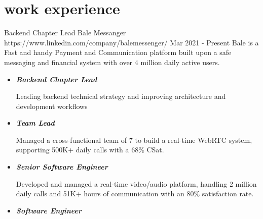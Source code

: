 \documentclass[a4paper]{article}
\begin{document}
\begin{minipage}[t]{0.65\textwidth}
  \section{work experience}
  {
    \expheadingwithlink
      {Backend Chapter Lead}
      {Bale Messanger}
      {https://www.linkedin.com/company/balemessenger/}
      {Mar 2021 - Present}
      {Bale is a Fast and handy Payment and Communication platform built upon a safe messaging and financial system with over 4 million daily active users.}
    \begin{itemize}[leftmargin=.5cm, itemsep=1pt]
        \item 
            \begin{small}
                \textbf{\emph{Backend Chapter Lead}} \newline
                \begin{justifying}\small 
                    Leading backend technical strategy and improving architecture and development workflows
                \end{justifying}
            \end{small}
        \item
            \begin{small}
                \textbf{\emph{Team Lead}} \newline
                \begin{justifying}\small 
                    Managed a cross-functional team of 7 to build a real-time WebRTC system, supporting 500K+ daily calls with a 68\% CSat.
                \end{justifying}
            \end{small}
        \item
            \begin{small}
                \textbf{\emph{Senior Software Engineer}} \newline
                \begin{justifying}\small 
                    Developed and managed a real-time video/audio platform, handling 2 million daily calls and 51K+ hours of communication with an 80\% satisfaction rate.
                \end{justifying}
            \end{small}
        \item
            \begin{small}
                \textbf{\emph{Software Engineer}} \newline


\end{small}
\end{itemize}}
\end{minipage}
\end{document}
